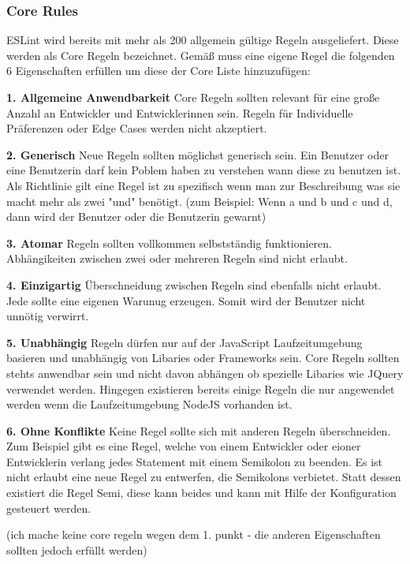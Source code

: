 \subsubsection{Core Rules}
\label{subsubsection:core_rules}

ESLint wird bereits mit mehr als 200 allgemein gültige Regeln ausgeliefert. Diese werden als Core Regeln bezeichnet. Gemäß \autocite{ESLintNewRules} muss eine eigene Regel die folgenden 6 Eigenschaften erfüllen um diese der Core Liste hinzuzufügen:

\textbf{1. Allgemeine Anwendbarkeit}
Core Regeln sollten relevant für eine große Anzahl an Entwickler und Entwicklerinnen sein. Regeln für Individuelle Präferenzen oder Edge Cases werden nicht akzeptiert.

\textbf{2. Generisch}
Neue Regeln sollten möglichst generisch sein. Ein Benutzer oder eine Benutzerin darf kein Poblem haben zu verstehen wann diese zu benutzen ist. Als Richtlinie gilt eine Regel ist zu spezifisch wenn man zur Beschreibung was sie macht mehr als zwei "und" benötigt. (zum Beispiel: Wenn a und b und c und d, dann wird der Benutzer oder die Benutzerin gewarnt)

\textbf{3. Atomar}
Regeln sollten vollkommen selbstständig funktionieren. Abhängikeiten zwischen zwei oder mehreren Regeln sind nicht erlaubt.

\textbf{4. Einzigartig}
Überschneidung zwischen Regeln sind ebenfalls nicht erlaubt. Jede sollte eine eigenen Warunug erzeugen. Somit wird der Benutzer nicht unnötig verwirrt.

\textbf{5. Unabhängig}
Regeln dürfen nur auf der JavaScript Laufzeitumgebung basieren und unabhängig von Libaries oder Frameworks sein. Core Regeln sollten stehts anwendbar sein und nicht davon abhängen ob spezielle Libaries wie JQuery verwendet werden. Hingegen existieren bereits einige Regeln die nur angewendet werden wenn die Laufzeitumgebung NodeJS vorhanden ist.

\textbf{6. Ohne Konflikte}
Keine Regel sollte sich mit anderen Regeln überschneiden. Zum Beispiel gibt es eine Regel, welche von einem Entwickler oder eioner Entwicklerin verlang jedes Statement mit einem Semikolon zu beenden. Es ist nicht erlaubt eine neue Regel zu entwerfen, die Semikolons verbietet. Statt dessen existiert die Regel Semi, diese kann beides und kann mit Hilfe der Konfiguration gesteuert werden.

(ich mache keine core regeln wegen dem 1. punkt - die anderen Eigenschaften sollten jedoch erfüllt werden)

